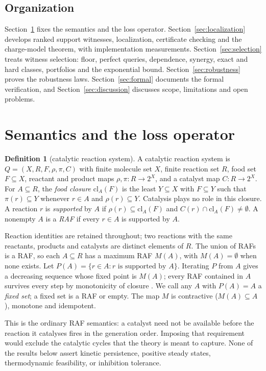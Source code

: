\documentclass[11pt,a4paper]{article}
\theoremstyle{plain}
\theoremstyle{definition}
\newtheorem{definition}[theorem]{Definition}
\theoremstyle{remark}
\newcommand{\cl}{\mathrm{cl}}
\begin{document}
\subsection{Organization}

Section~\ref{sec:prelim} fixes the semantics and the loss operator. Section~\ref{sec:localization} develops ranked support witnesses, localization, certificate checking and the charge-model theorem, with implementation measurements. Section~\ref{sec:selection} treats witness selection: floor, perfect queries, dependence, synergy, exact and hard classes, portfolios and the exponential bound. Section~\ref{sec:robustness} proves the robustness laws. Section~\ref{sec:formal} documents the formal verification, and Section~\ref{sec:discussion} discusses scope, limitations and open problems.

\section{Semantics and the loss operator}\label{sec:prelim}

\begin{definition}[catalytic reaction system]
A catalytic reaction system is $Q=(X,R,F,\rho,\pi,C)$ with finite molecule set $X$, finite reaction set $R$, food set $F\subseteq X$, reactant and product maps $\rho,\pi:R\to 2^{X}$, and a catalyst map $C:R\to 2^{X}$. For $A\subseteq R$, the \emph{food closure} $\cl_A(F)$ is the least $Y\subseteq X$ with $F\subseteq Y$ such that $\pi(r)\subseteq Y$ whenever $r\in A$ and $\rho(r)\subseteq Y$. Catalysis plays no role in this closure. A reaction $r$ is \emph{supported} by $A$ if $\rho(r)\subseteq\cl_A(F)$ and $C(r)\cap\cl_A(F)\neq\emptyset$. A nonempty $A$ is a \emph{RAF} if every $r\in A$ is supported by $A$.
\end{definition}

Reaction identities are retained throughout; two reactions with the same reactants, products and catalysts are distinct elements of $R$. The union of RAFs is a RAF, so each $A\subseteq R$ has a maximum RAF $M(A)$, with $M(A)=\emptyset$ when none exists. Let $P(A)=\{r\in A: r\text{ is supported by }A\}$. Iterating $P$ from $A$ gives a decreasing sequence whose fixed point is $M(A)$; every RAF contained in $A$ survives every step by monotonicity of closure \citep{hordijk2004}. We call any $A$ with $P(A)=A$ a \emph{fixed set}; a fixed set is a RAF or empty. The map $M$ is contractive ($M(A)\subseteq A$), monotone and idempotent.

This is the ordinary RAF semantics: a catalyst need not be available before the reaction it catalyses fires in the generation order. Imposing that requirement would exclude the catalytic cycles that the theory is meant to capture. None of the results below assert kinetic persistence, positive steady states, thermodynamic feasibility, or inhibition tolerance.
\end{document}
